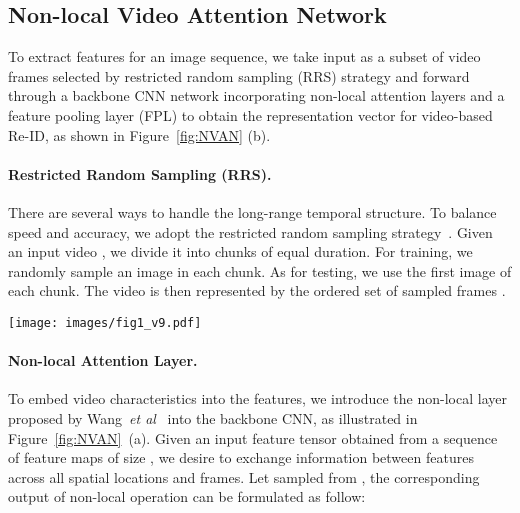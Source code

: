 \documentclass{bmvc2k}
\def\etal{\emph{et al}\bmvaOneDot}
\newcommand{\mycaption}[2]{\caption{\textbf{#1.}~#2}}
\begin{document}
\subsection{Non-local Video Attention Network}
\label{sub:NVAN}



To extract features for an image sequence, we take input as a subset of video frames selected by restricted random sampling (RRS) strategy and forward through a backbone CNN network incorporating non-local attention layers and a feature pooling layer (FPL) to obtain the representation vector for video-based Re-ID, as shown in Figure~\ref{fig:NVAN} (b).
\vspace{-3mm}

\paragraph{Restricted Random Sampling (RRS).}
There are several ways to handle the long-range temporal structure.
To balance speed and accuracy, we adopt the restricted random sampling strategy~\cite{diversity,wang2016temporal}. 
Given an input video , we divide it into  chunks  of equal duration. 
For training, we randomly sample an image  in each chunk.
As for testing, we use the first image of each chunk. 
The video is then represented by the ordered set of sampled frames .
\begin{figure*}[t!]
	\centering
    \texttt{[image: images/fig1\_v9.pdf]}
    \mycaption{(a) Details of Non-local Attention Layer. (b) Overview of our Non-local Video Attention Network (NVAN)}{In NVAN, given  sampled images as input, the 5-Non-local ResNet-50 network generates  features, which incorporates the spatial and temporal information of videos at multi-levels with the help of Non-local Attention Layers. The features are then pooled into one vector in FPL for loss optimization and Re-ID matching.}
    \label{fig:NVAN}
    \vspace{-3mm}
\end{figure*}




\paragraph{Non-local Attention Layer.} 
To embed video characteristics into the features, we introduce the non-local layer proposed by Wang~\etal~\cite{non-local} into the backbone CNN, as illustrated in Figure~\ref{fig:NVAN}~(a).
Given an input feature tensor  obtained from a sequence of  feature maps of size , we desire to exchange information between features across all spatial locations and frames.
Let  sampled from , the corresponding output  of non-local operation can be formulated as follow:
\end{document}
